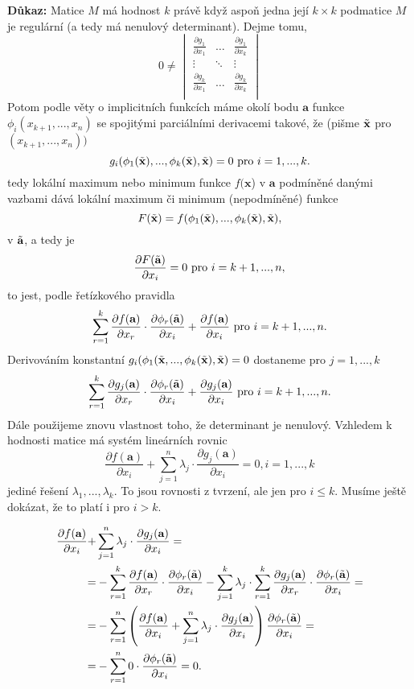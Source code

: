\documentclass[../main.tex]{subfiles}
\begin{document}
\vspace{5mm}
\noindent
\textbf{Důkaz:} Matice $M$ má hodnost $k$ právě když aspoň jedna její $k\times k$ podmatice $M$ je regulární (a tedy má nenulový determinant). Dejme tomu,
\[ 0 \neq \begin{vmatrix}
\frac{\partial g_1}{\partial x_1} & \dots & \frac{\partial g_1}{\partial x_k}\\
\vdots & \ddots & \vdots\\
\frac{\partial g_k}{\partial x_1} & \dots & \frac{\partial g_k}{\partial x_k}\\
\end{vmatrix}\]
Potom podle věty o implicitních funkcích máme okolí bodu $\textbf{a}$ funkce $\phi_i(x_{k+1},...,x_n)$
se spojitými parciálními derivacemi takové, že (pišme $\Tilde{\textbf{x}}$ pro $(x_{k+1},...,x_n))$
\[g_i(\phi_1(\Tilde{\textbf{x}}),...,\phi_k(\Tilde{\textbf{x}}),\Tilde{\textbf{x}}) = 0 \text{ pro } i=1,...,k.\]
tedy lokální maximum nebo minimum funkce $f(\textbf{x}$) v $\textbf{a}$ podmíněné danými vazbami dává lokální maximum či minimum (nepodmíněné) funkce
\[F(\Tilde{\textbf{x}}) = f(\phi_1(\Tilde{\textbf{x}}),...,\phi_k(\Tilde{\textbf{x}}),\Tilde{\textbf{x}}),\]
v $\Tilde{\textbf{a}}$, a tedy je 
\[\frac{\partial F(\Tilde{\textbf{a}})}{\partial x_i} = 0 \text{ pro } i = k+1,...,n,\]
to jest, podle řetízkového pravidla
\[\sum^k_{r=1}\frac{\partial f(\textbf{a})}{\partial x_r}\cdot \frac{\partial \phi_r(\Tilde{\textbf{a}})}{\partial x_i} + \frac{\partial f(\textbf{a})}{\partial x_i} \text{ pro } i = k+1,...,n.\]
Derivováním konstantní $g_i(\phi_1(\Tilde{\textbf{x}},...,\phi_k(\Tilde{\textbf{x}}),\Tilde{\textbf{x}}) = 0$ dostaneme pro $j = 1,...,k$
\[\sum^k_{r=1}\frac{\partial g_j(\textbf{a})}{\partial x_r}\cdot \frac{\partial \phi_r(\Tilde{\textbf{a}})}{\partial x_i} + \frac{\partial g_j(\textbf{a})}{\partial x_i} \text{ pro } i = k+1,...,n.\]
Dále použijeme znovu vlastnost toho, že determinant je nenulový. Vzhledem k hodnosti matice má systém lineárních rovnic
\[\frac{\partial f(\textbf{a})}{\partial x_i} + \sum^n_{j=1}\lambda_j\cdot\frac{\partial g_j(\textbf{a})}{\partial x_i} = 0, i = 1,...,k\]
jediné řešení $\lambda_1,...,\lambda_k.$ To jsou rovnosti z tvrzení, ale jen pro $i \leq k$. Musíme ještě dokázat, že to platí i pro $i > k$. 

\begin{align*}
\frac{\partial f(\textbf{a})}{\partial x_i} + & \sum^n_{j=1}\lambda_j\cdot\frac{\partial g_j(\textbf{a})}{\partial x_i}=\\
= & - \sum^k_{r=1} \frac{\partial f(\textbf{a})}{\partial x_r}\cdot\frac{\partial \phi_r(\Tilde{\textbf{a}})}{\partial x_i} -
\sum^k_{j=1}\lambda_j\cdot\sum^k_{r=1}\frac{\partial g_j(\textbf{a})}{\partial x_r}\cdot\frac{\partial \phi_r(\Tilde{\textbf{a}})}{\partial x_i} =\\
= & - \sum^n_{r=1}\left(\frac{\partial f(\textbf{a})}{\partial x_i}+\sum^n_{j=1}\lambda_j\cdot\frac{\partial g_j(\textbf{a})}{\partial x_i}\right)\frac{\partial \phi_r(\Tilde{\textbf{a}})}{\partial x_i}=\\
= & - \sum^n_{r=1}0\cdot\frac{\partial \phi_r(\Tilde{\textbf{a}})}{\partial x_i}=0.
\end{align*}
\end{document}
